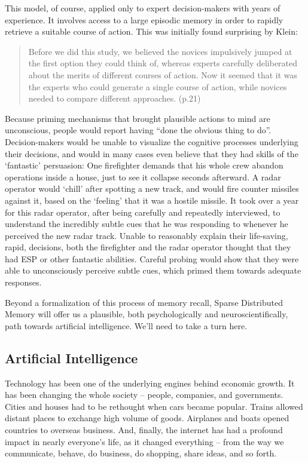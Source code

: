 This model, of course, applied only to expert decision-makers with years of experience.  It involves access to a large episodic memory in order to rapidly retrieve a suitable course of action.  This was initially found surprising by Klein:

\begin{quote}
	Before we did this study, we believed the novices impulsively jumped at the first option they could think of, whereas experts carefully deliberated about the merits of different courses of action.  Now it seemed that it was the experts who could generate a single course of action, while novices needed to compare different approaches. (p.21)
\end{quote}

Because priming mechanisms that brought plausible actions to mind are unconscious, people would report having ``done the obvious thing to do''.  Decision-makers would be unable to visualize the cognitive processes underlying their decisions, and would in many cases even believe that they had skills of the `fantastic' persuasion:  One firefighter demands that his whole crew abandon operations inside a house, just to see it collapse seconds afterward.  A radar operator would `chill' after spotting a new track, and would fire counter missiles against it, based on the `feeling' that it was a hostile missile.  It took over a year for this radar operator, after being carefully and repeatedly interviewed, to understand the incredibly subtle cues that he was responding to whenever he perceived the new radar track.  Unable to reasonably explain their life-saving, rapid, decisions, both the firefighter and the radar operator thought that they had ESP or other fantastic abilities. Careful probing would show that they were able to unconsciously perceive subtle cues, which primed them towards adequate responses.

Beyond a formalization of this process of memory recall, Sparse Distributed Memory will offer us a plausible, both psychologically and neuroscientifically, path towards artificial intelligence.  We'll need to take a turn here. 

\subsection{Artificial Intelligence}


Technology has been one of the underlying engines behind economic growth. It has been changing the whole society -- people, companies, and governments. Cities and houses had to be rethought when cars became popular. Trains allowed distant places to exchange high volume of goods. Airplanes and boats opened countries to overseas business. And, finally, the internet has had a profound impact in nearly everyone's life, as it changed everything -- from the way we communicate, behave, do business, do shopping, share ideas, and so forth.

